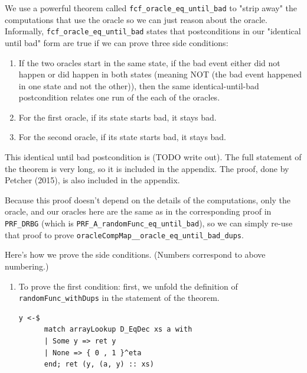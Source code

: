 \documentclass[12pt,lot, lof]{puthesis}
\newcommand{\li} {\lstinline}
\begin{document}
{%
We use a powerful theorem called \li|fcf_oracle_eq_until_bad| to "strip away" the computations that use the oracle so we can just reason about the oracle. Informally, \li|fcf_oracle_eq_until_bad| states that postconditions in our "identical until bad" form are true if we can prove three side conditions:

\begin{enumerate}
\item If the two oracles start in the same state, if the bad event either did not happen or did happen in both states (meaning NOT (the bad event happened in one state and not the other)), then the same identical-until-bad postcondition relates one run of the each of the oracles.

\item For the first oracle, if its state starts bad, it stays bad.

\item For the second oracle, if its state starts bad, it stays bad.

\end{enumerate}

This identical until bad postcondition is (TODO write out). The full statement of the theorem is very long, so it is included in the appendix. The proof, done by Petcher (2015), is also included in the appendix. %


Because this proof doesn't depend on the details of the computations, only the oracle, and our oracles here are the same as in the corresponding proof in \li|PRF_DRBG| (which is \li|PRF_A_randomFunc_eq_until_bad|), so we can simply re-use that proof to prove \li|oracleCompMap__oracle_eq_until_bad_dups|.

Here's how we prove the side conditions. (Numbers correspond to above numbering.) 

\begin{enumerate}
\item To prove the first condition: first, we unfold the definition of \li|randomFunc_withDups| in the statement of the theorem.

\begin{lstlisting}
y <-$
      match arrayLookup D_EqDec xs a with
      | Some y => ret y
      | None => { 0 , 1 }^eta
      end; ret (y, (a, y) :: xs)
\end{lstlisting}      


\end{enumerate}}
\end{document}
